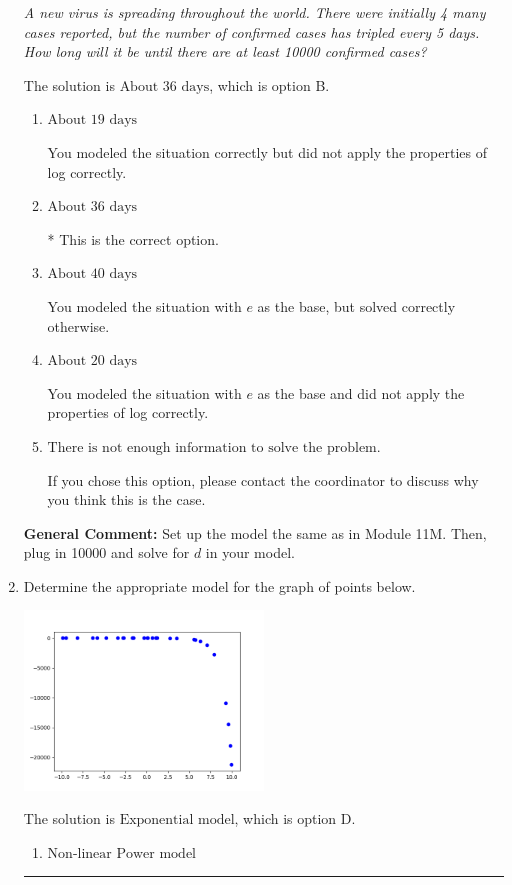 \documentclass{extbook}[14pt]
\newcommand{\litem}[1]{\item #1

\rule{\textwidth}{0.4pt}}
\begin{document}
\begin{enumerate}
{\begin{center}
    \textit{ A new virus is spreading throughout the world. There were initially 4 many cases reported, but the number of confirmed cases has tripled every 5 days. How long will it be until there are at least 10000 confirmed cases? }
\end{center}
The solution is \( \text{About } 36 \text{ days} \), which is option B.\begin{enumerate}[label=\Alph*.]
\item \( \text{About } 19 \text{ days} \)

You modeled the situation correctly but did not apply the properties of log correctly.
\item \( \text{About } 36 \text{ days} \)

* This is the correct option.
\item \( \text{About } 40 \text{ days} \)

You modeled the situation with $e$ as the base, but solved correctly otherwise.
\item \( \text{About } 20 \text{ days} \)

You modeled the situation with $e$ as the base and did not apply the properties of log correctly.
\item \( \text{There is not enough information to solve the problem.} \)

If you chose this option, please contact the coordinator to discuss why you think this is the case.
\end{enumerate}

\textbf{General Comment:} Set up the model the same as in Module 11M. Then, plug in 10000 and solve for $d$ in your model.
}
\litem{
Determine the appropriate model for the graph of points below.

\begin{center}
    \includegraphics[width=0.5\textwidth]{../Figures/identifyModelGraph12C.png}
\end{center}


The solution is \( \text{Exponential model} \), which is option D.\begin{enumerate}[label=\Alph*.]
\item \( \text{Non-linear Power model} \)


\end{enumerate}}
\end{enumerate}
\end{document}
